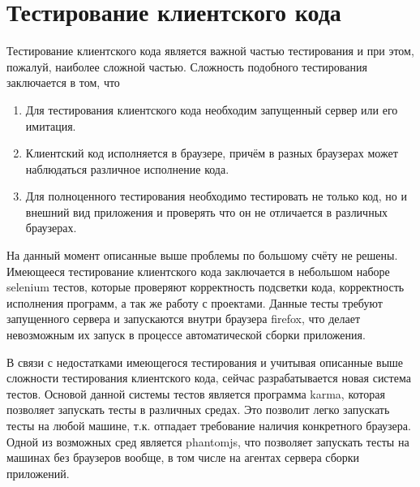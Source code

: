 \section{Тестирование клиентского кода}
	Тестирование клиентского кода является важной частью тестирования и при этом, пожалуй, наиболее сложной частью. Сложность подобного тестирования заключается в том, что
\begin{enumerate}
	\item  Для тестирования клиентского кода необходим запущенный сервер или его имитация.
	\item Клиентский код исполняется в браузере, причём в разных браузерах может наблюдаться  различное исполнение кода.
	\item Для полноценного тестирования необходимо тестировать не только код, но и внешний вид приложения и проверять что он не отличается в различных браузерах.
\end{enumerate}

	На данный момент описанные выше проблемы по большому счёту не решены. Имеющееся тестирование клиентского кода заключается в небольшом наборе selenium тестов, которые проверяют корректность подсветки кода, корректность исполнения программ, а так же работу с проектами. Данные тесты требуют запущенного сервера и запускаются внутри браузера firefox, что делает невозможным их запуск в процессе автоматической сборки приложения.
	
	В связи с недостатками имеющегося тестирования и учитывая описанные выше сложности тестирования клиентского кода, сейчас разрабатывается новая система тестов. 
Основой данной системы тестов является программа karma, которая позволяет запускать тесты в различных средах. Это позволит легко запускать тесты на любой машине, т.к. отпадает требование наличия конкретного браузера. Одной из возможных сред является phantomjs, что позволяет запускать тесты на машинах без браузеров вообще, в том числе на агентах сервера сборки приложений. 
	
	